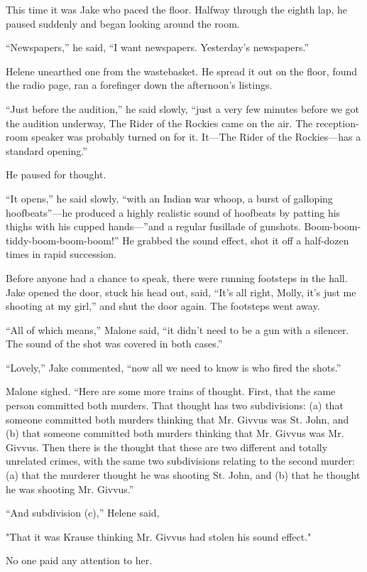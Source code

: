 \documentclass{novel}
\begin{document}
This time it was Jake who paced the floor. Halfway through the eighth lap, he paused suddenly and began looking around the room.

“Newspapers,” he said, “I want newspapers. Yesterday’s newspapers.”

Helene unearthed one from the wastebasket. He spread it out on the floor, found the radio page, ran a forefinger down the afternoon’s listings.

“Just before the audition,” he said slowly, “just a very few minutes before we got the audition underway, The Rider of the Rockies came on the air. The reception-room speaker was probably turned on for it. It—The Rider of the Rockies—has a standard opening.”

He paused for thought.

“It opens,” he said slowly, “with an Indian war whoop, a burst of galloping hoofbeats”—he produced a highly realistic sound of hoofbeats by patting his thighs with his cupped hands—”and a regular fusillade of gunshots. Boom-boom-tiddy-boom-boom-boom!” He grabbed the sound effect, shot it off a half-dozen times in rapid succession.

Before anyone had a chance to speak, there were running footsteps in the hall. Jake opened the door, stuck his head out, said, “It’s all right, Molly, it’s just me shooting at my girl,” and shut the door again. The footsteps went away.

“All of which means,” Malone said, “it didn’t need to be a gun with a silencer. The sound of the shot was covered in both cases.”

“Lovely,” Jake commented, “now all we need to know is who fired the shots.”

Malone sighed. “Here are some more trains of thought. First, that the same person committed both murders. That thought has two subdivisions: (a) that someone committed both murders thinking that Mr. Givvus was St. John, and (b) that someone committed both murders thinking that Mr. Givvus was Mr. Givvus. Then there is the thought that these are two different and totally unrelated crimes, with the same two subdivisions relating to the second murder: (a) that the murderer thought he was shooting St. John, and (b) that he thought he was shooting Mr. Givvus.”

“And subdivision (c),” Helene said,

"That it was Krause thinking Mr. Givvus had stolen his sound effect."

No one paid any attention to her.
\end{document}
